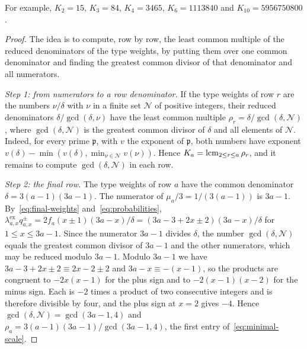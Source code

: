 For example, \(K_2=15\), \(K_3=84\), \(K_4=3465\), \(K_6=1113840\) and
\(K_{10}=5956750800\).

\begin{proof}
The idea is to compute, row by row, the least common multiple of the
reduced denominators of the type weights, by putting them over one
common denominator and finding the greatest common divisor of that
denominator and all numerators.

\emph{Step 1: from numerators to a row denominator.} If the type
weights of row \(r\) are the numbers \(\nu/\delta\) with \(\nu\) in a
finite set \(\mathcal N\) of positive integers, their reduced
denominators \(\delta/\gcd(\delta,\nu)\) have the least common multiple
\(\rho_r=\delta/\gcd(\delta,\mathcal N)\), where
\(\gcd(\delta,\mathcal N)\) is the greatest common divisor of \(\delta\)
and all elements of \(\mathcal N\). Indeed, for every prime
\(\mathfrak p\), with \(v\) the exponent of \(\mathfrak p\), both numbers
have exponent \(v(\delta)-\min(v(\delta),\min_{\nu\in\mathcal N}v(\nu))\).
Hence \(K_a=\operatorname{lcm}_{2\le r\le a}\rho_r\), and it remains to compute
\(\gcd(\delta,\mathcal N)\) in each row.

\emph{Step 2: the final row.} The type weights of row \(a\) have the
common denominator \(\delta=3(a-1)(3a-1)\). The numerator of
\(\mu_a/3=1/(3(a-1))\) is \(3a-1\). By~\eqref{eq:final-weights}
and~\eqref{eq:probabilities},
\(\lambda^{\mathrm{ex}}_{a,x}q^\pm_{a,x}=2f_a(x\pm1)(3a-x)/\delta
=(3a-3+2x\pm2)(3a-x)/\delta\) for \(1\le x\le3a-1\). Since the numerator \(3a-1\) divides \(\delta\), the number
\(\gcd(\delta,\mathcal N)\) equals the greatest common divisor of
\(3a-1\) and the other numerators, which may be reduced modulo \(3a-1\).
Modulo \(3a-1\) we have \(3a-3+2x\pm2\equiv2x-2\pm2\) and
\(3a-x\equiv-(x-1)\), so the products are congruent to \(-2x(x-1)\) for
the plus sign and to \(-2(x-1)(x-2)\) for the minus sign. Each is \(-2\)
times a product of two consecutive integers and is therefore divisible by
four, and the plus sign at \(x=2\) gives \(-4\). Hence
\(\gcd(\delta,\mathcal N)=\gcd(3a-1,4)\) and
\(\rho_a=3(a-1)(3a-1)/\gcd(3a-1,4)\), the first entry
of~\eqref{eq:minimal-scale}.


\end{proof}
